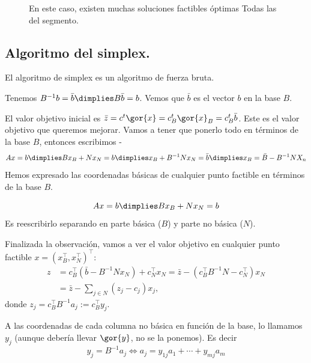 \begin{figure}[h!]
\centering
{}
\caption{En este caso, existen muchas soluciones factibles óptimas Todas las del segmento.}
\end{figure}


 
\begin{theorem}

\end{theorem}
  
\subsection{Algoritmo del simplex.}


El algoritmo de simplex es un algoritmo de fuerza bruta.

Tenemos $B^{-1}b = \bar{b} \dimplies B\bar{b} = b$. Vemos que $\bar{b}$ es el vector $b$ en la base $B$.

El valor objetivo inicial es $\bar{z} = c^t\gor{x} = c^t_B\gor{x}_B = c^t_B\bar{b}$. Este es el valor objetivo que queremos mejorar. Vamos a tener que ponerlo todo en términos de la base $B$, entonces escribimos 
-
\[Ax = b \dimplies Bx_B + Nx_N = b \dimplies x_B + B^{-1}Nx_N = \bar{b}\dimplies x_B = \bar{B} - B^{-1}NX_n \]
Hemos expresado las coordenadas básicas de cualquier punto factible en términos de la base $B$.

\obs \[Ax = b \dimplies Bx_B + Nx_N = b \] Es reescribirlo separando en parte básica ($B$) y parte no básica ($N$).


Finalizada la observación, vamos a ver el valor objetivo en cualquier punto factible $x=(x_B^\top,x_N^\top)^\top$:
\begin{align*}
z &= c_B^\top (\bar{b}-B^{-1} N x_N)+c^\top_N x_N =
 \bar{z}-(c_B^\top B^{-1} N - c_N^\top)x_N\\
  &=\bar{z}- \sum_{j\in N} (z_j-c_j)x_j,
\end{align*}
donde $z_j = c_B^\top B^{-1} a_j:= c_B^\top y_j$.

A las coordenadas de cada columna no básica en función de la base, lo llamamos $y_j$ (aunque debería llevar $\gor{y}$, no se la ponemos). Es decir 
\[y_j=B^{-1} a_j\Leftrightarrow a_j = y_{1j} a_1+\cdots + y_{mj}a_m\]


